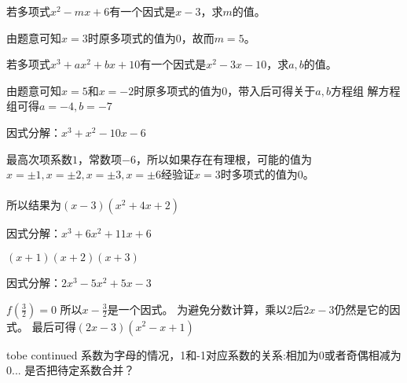 \documentclass[windows,csize4,answers]{BHCexam}
\begin{document}
\begin{groups}

    \begin{questions}[]
        \question[5] 若多项式$x^2-mx+6$有一个因式是$x-3$，求$m$的值。
        \begin{solution}{0.5cm}
            \methodonly 由题意可知$x=3$时原多项式的值为$0$，故而$m=5$。
        \end{solution}
        \vspace{3.5cm}

        \question[5] 若多项式$x^3+ax^2+bx+10$有一个因式是$x^2-3x-10$，求$a,b$的值。
        \begin{solution}{0.5cm}
            \methodonly 由题意可知$x=5$和$x=-2$时原多项式的值为$0$，带入后可得关于$a,b$方程组
            解方程组可得$a=-4,b=-7$
        \end{solution}
        \vspace{3.5cm}

        \question[5] 因式分解：$x^3+x^2-10x-6$
        \begin{solution}{0.5cm}
            \methodonly 最高次项系数$1$，常数项$-6$，所以如果存在有理根，可能的值为
            $x=\pm 1, x=\pm 2, x=\pm 3,x=\pm 6$经验证$x=3$时多项式的值为$0$。\\ 
             \\ 
            所以结果为$(x-3)(x^2+4x+2)$
        \end{solution}
        \vspace{3.5cm}

        \question[5] 因式分解：$x^3+6x^2+11x+6$
        \begin{solution}{0.5cm}
            \methodonly $(x+1)(x+2)(x+3)$
        \end{solution}
        \vspace{3.5cm}

        \question[5] 因式分解：$2x^3-5x^2+5x-3$
        \begin{solution}{0.5cm}
            \methodonly $f(\frac{3}{2})=0$ 所以$x-\frac{3}{2}$是一个因式。
            为避免分数计算，乘以$2$后$2x-3$仍然是它的因式。
            最后可得$(2x-3)(x^2-x+1)$
        \end{solution}

tobe continued
系数为字母的情况，1和-1对应系数的关系:相加为0或者奇偶相减为0...
是否把待定系数合并？

    \end{questions}
\end{groups}

\label{lastpage}
\end{document}
